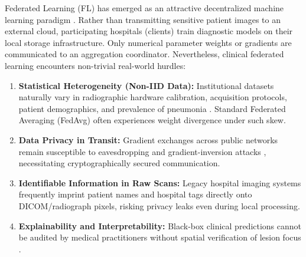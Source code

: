 \documentclass[journal]{IEEEtran}
\begin{document}
Federated Learning (FL) has emerged as an attractive decentralized machine learning paradigm \cite{mcmahan2017communication, kairouz2021advances, rieke2020future}. Rather than transmitting sensitive patient images to an external cloud, participating hospitals (clients) train diagnostic models on their local storage infrastructure. Only numerical parameter weights or gradients are communicated to an aggregation coordinator. Nevertheless, clinical federated learning encounters non-trivial real-world hurdles:
\begin{enumerate}
    \item \textbf{Statistical Heterogeneity (Non-IID Data):} Institutional datasets naturally vary in radiographic hardware calibration, acquisition protocols, patient demographics, and prevalence of pneumonia \cite{li2020federated}. Standard Federated Averaging (FedAvg) often experiences weight divergence under such skew.
    \item \textbf{Data Privacy in Transit:} Gradient exchanges across public networks remain susceptible to eavesdropping and gradient-inversion attacks \cite{zhu2019deep}, necessitating cryptographically secured communication.
    \item \textbf{Identifiable Information in Raw Scans:} Legacy hospital imaging systems frequently imprint patient names and hospital tags directly onto DICOM/radiograph pixels, risking privacy leaks even during local processing.
    \item \textbf{Explainability and Interpretability:} Black-box clinical predictions cannot be audited by medical practitioners without spatial verification of lesion focus \cite{selvaraju2017gradcam}.
\end{enumerate}
\end{document}
